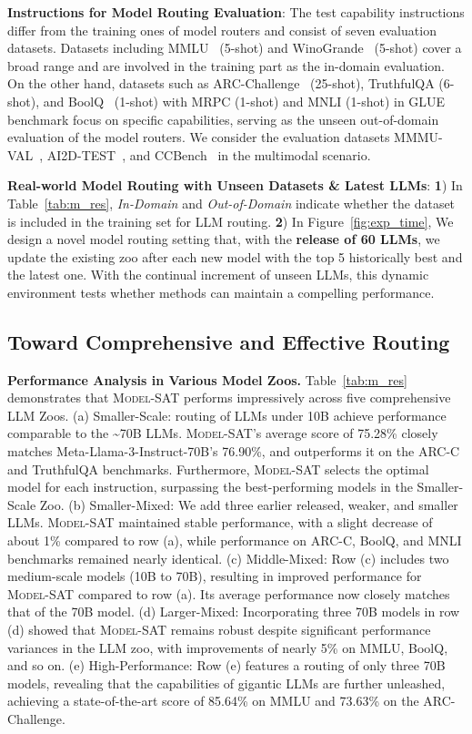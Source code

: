 \textbf{Instructions for Model Routing Evaluation}:
The test capability instructions differ from the training ones of model routers and consist of seven evaluation datasets.
Datasets including MMLU~\cite{DBLP:conf/iclr/HendrycksBBZMSS21} (5-shot) and WinoGrande~\cite{DBLP:conf/aaai/SakaguchiBBC20} (5-shot) cover a broad range and are involved in the training part as the in-domain evaluation.
On the other hand, datasets such as ARC-Challenge~\cite{DBLP:journals/corr/abs-2102-03315} (25-shot), TruthfulQA (6-shot), and BoolQ~\cite{clark2019boolq} (1-shot) with MRPC (1-shot) and MNLI (1-shot) in GLUE~\cite{DBLP:conf/iclr/WangSMHLB19} benchmark focus on specific capabilities, serving as the unseen out-of-domain evaluation of the model routers.
We consider the evaluation datasets MMMU-VAL~\cite{mmlu}, AI2D-TEST~\cite{kembhavi2016ai2d}, and CCBench~\cite{liu2024mmbenchmultimodalmodelallaround} in the multimodal scenario.

\textbf{Real-world Model Routing with Unseen Datasets \& Latest LLMs}: \textbf{1}) In Table~\ref{tab:m_res}, \textit{In-Domain} and \textit{Out-of-Domain} indicate whether the dataset is included in the training set for LLM routing. \textbf{2}) In Figure~\ref{fig:exp_time}, We design a novel model routing setting that, with the \textbf{release of 60 LLMs}, we update the existing zoo after each new model with the top 5 historically best and the latest one.
With the continual increment of unseen LLMs, this dynamic environment tests whether methods can maintain a compelling performance.

\subsection{Toward Comprehensive and Effective Routing}
\label{sec:results}
\textbf{Performance Analysis in Various Model Zoos.} Table~\ref{tab:m_res} demonstrates that \textsc{Model-SAT} performs impressively across five comprehensive LLM Zoos.
(a) Smaller-Scale: routing of LLMs under 10B achieve performance comparable to the \textasciitilde70B LLMs. \textsc{Model-SAT}'s average score of 75.28\% closely matches Meta-Llama-3-Instruct-70B's 76.90\%, and outperforms it on the ARC-C and TruthfulQA benchmarks. Furthermore, \textsc{Model-SAT} selects the optimal model for each instruction, surpassing the best-performing models in the Smaller-Scale Zoo.
(b) Smaller-Mixed: We add three earlier released, weaker, and smaller LLMs. \textsc{Model-SAT} maintained stable performance, with a slight decrease of about 1\% compared to row (a), while performance on ARC-C, BoolQ, and MNLI benchmarks remained nearly identical.
(c) Middle-Mixed: Row (c) includes two medium-scale models (10B to 70B), resulting in improved performance for \textsc{Model-SAT} compared to row (a). Its average performance now closely matches that of the 70B model.
(d) Larger-Mixed: Incorporating three 70B models in row (d) showed that \textsc{Model-SAT} remains robust despite significant performance variances in the LLM zoo, with improvements of nearly 5\% on MMLU, BoolQ, and so on.
(e) High-Performance: Row (e) features a routing of only three 70B models, revealing that the capabilities of gigantic LLMs are further unleashed, achieving a state-of-the-art score of 85.64\% on MMLU and 73.63\% on the ARC-Challenge.


